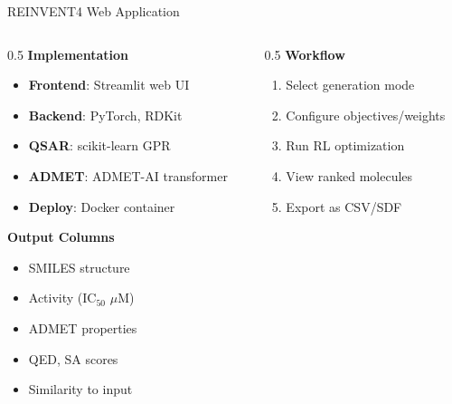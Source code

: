\documentclass[aspectratio=169,xcolor=table]{beamer}
\begin{document}
\begin{frame}{REINVENT4 Web Application}

\begin{columns}
\begin{column}{0.5\textwidth}
\textbf{Implementation}
\begin{itemize}\setlength{\itemsep}{2pt}
    \item \textbf{Frontend}: Streamlit web UI
    \item \textbf{Backend}: PyTorch, RDKit
    \item \textbf{QSAR}: scikit-learn GPR
    \item \textbf{ADMET}: ADMET-AI transformer
    \item \textbf{Deploy}: Docker container
\end{itemize}

\vspace{0.3cm}

\textbf{Output Columns}
\begin{itemize}\setlength{\itemsep}{0pt}
    \item SMILES structure
    \item Activity (IC$_{50}$ $\mu$M)
    \item ADMET properties
    \item QED, SA scores
    \item Similarity to input
\end{itemize}
\end{column}

\begin{column}{0.5\textwidth}
\textbf{Workflow}
\begin{enumerate}\setlength{\itemsep}{2pt}
    \item Select generation mode
    \item Configure objectives/weights
    \item Run RL optimization
    \item View ranked molecules
    \item Export as CSV/SDF
\end{enumerate}
\end{column}
\end{columns}

\end{frame}
\end{document}
